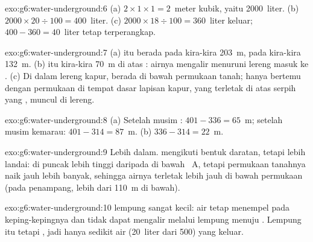 \begin{solution}{exo:g6:water-underground:6}
(a) $2 \times 1 \times 1 = 2$~meter kubik, yaitu 2000~liter.
(b) $2000 \times 20 \div 100 = 400$~liter. (c) $2000 \times 18 \div 100 =
360$~liter keluar; $400 - 360 = 40$~liter tetap terperangkap.
\end{solution}

\begin{solution}{exo:g6:water-underground:7}
(a)  itu berada pada kira-kira 203~m,  pada kira-kira
132~m. (b)  itu kira-kira 70~m di atas : airnya mengalir
menuruni lereng masuk ke . (c) Di dalam lereng  kapur,  berada di bawah permukaan tanah;  hanya bertemu dengan
permukaan di tempat dasar lapisan kapur, yang terletak di atas serpih yang
, muncul di lereng.
\end{solution}

\begin{solution}{exo:g6:water-underground:8}
(a) Setelah musim : $401 - 336 = 65$~m; setelah musim kemarau:
$401 - 314 = 87$~m. (b) $336 - 314 = 22$~m.
\end{solution}

\begin{solution}{exo:g6:water-underground:9}
Lebih dalam.  mengikuti bentuk daratan, tetapi lebih landai:
di puncak   lebih tinggi daripada di bawah ~A,
tetapi permukaan tanahnya naik jauh lebih banyak, sehingga airnya terletak
lebih jauh di bawah permukaan (pada penampang, lebih dari 110~m di bawah).
\end{solution}

\begin{solution}{exo:g6:water-underground:10}
 lempung sangat kecil: air tetap menempel pada keping-kepingnya
dan tidak dapat mengalir melalui lempung menuju . Lempung itu 
tetapi , jadi hanya sedikit air (20~liter dari 500) yang keluar.
\end{solution}

